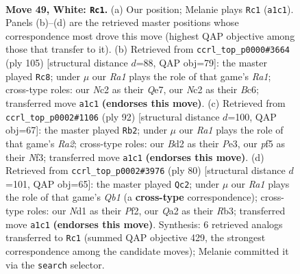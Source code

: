 \documentclass[11pt]{article}
\begin{document}
\clearpage

\begin{figure}[p]\centering
\begin{subfigure}{0.46\textwidth}\centering
\resizebox{\linewidth}{!}{%
\newchessgame
\chessboard[
  setfen={nr4k1/1q4n1/p2b1r2/P1p2p1p/3p1Pp1/1P4P1/QRNBP2P/R2N2K1 w - - 14 49},
  showmover=false,
  pgfstyle=straightmove, color=movearrow, markmove={a1-c1}
]}
\caption{}
\end{subfigure}\hfill
\begin{subfigure}{0.46\textwidth}\centering
\resizebox{\linewidth}{!}{%
\newchessgame
\chessboard[
  setfen={r5k1/3rqp2/1pbpn1p1/7p/1PP1Pp1P/1B1R1N2/3Q1PP1/4R1K1 b - - 36 53},
  showmover=false,
  pgfstyle=straightmove, color=movearrow, markmove={a8-c8}
]}
\caption{}
\end{subfigure}
\\[4pt]
\begin{subfigure}{0.46\textwidth}\centering
\resizebox{\linewidth}{!}{%
\newchessgame
\chessboard[
  setfen={1q6/rprn1pk1/2pb2p1/P2p3p/3P4/3BPNPP/R4PK1/RQ6 w - - 37 47},
  showmover=false,
  pgfstyle=straightmove, color=movearrow, markmove={a2-b2}
]}
\caption{}
\end{subfigure}\hfill
\begin{subfigure}{0.46\textwidth}\centering
\resizebox{\linewidth}{!}{%
\newchessgame
\chessboard[
  setfen={6k1/r4pp1/rnqb3p/2p1p3/2PpP3/PR1P1N1P/5PP1/RQB3K1 w - - 6 41},
  showmover=false,
  pgfstyle=straightmove, color=movearrow, markmove={b1-c2}
]}
\caption{}
\end{subfigure}
\caption{\textbf{Move 49, White: \texttt{Rc1}.} (a) Our position; Melanie plays \texttt{Rc1} (\texttt{a1c1}). Panels (b)--(d) are the retrieved master positions whose correspondence most drove this move (highest QAP objective among those that transfer to it). (b) Retrieved from \texttt{ccrl\_top\_p0000\#3664} (ply 105) [structural distance $d$=88, QAP obj=79]: the master played \texttt{Rc8}; under $\mu$ our \emph{Ra1} plays the role of that game's \emph{Ra1}; cross-type roles: our \emph{N}c2 as their \emph{Q}e7, our \emph{N}c2 as their \emph{B}c6; transferred move \texttt{a1c1} \textbf{(endorses this move)}. (c) Retrieved from \texttt{ccrl\_top\_p0002\#1106} (ply 92) [structural distance $d$=100, QAP obj=67]: the master played \texttt{Rb2}; under $\mu$ our \emph{Ra1} plays the role of that game's \emph{Ra2}; cross-type roles: our \emph{B}d2 as their \emph{P}e3, our \emph{p}f5 as their \emph{N}f3; transferred move \texttt{a1c1} \textbf{(endorses this move)}. (d) Retrieved from \texttt{ccrl\_top\_p0002\#3976} (ply 80) [structural distance $d$=101, QAP obj=65]: the master played \texttt{Qc2}; under $\mu$ our \emph{Ra1} plays the role of that game's \emph{Qb1} (a \textbf{cross-type} correspondence); cross-type roles: our \emph{N}d1 as their \emph{P}f2, our \emph{Q}a2 as their \emph{R}b3; transferred move \texttt{a1c1} \textbf{(endorses this move)}. Synthesis: 6 retrieved analogs transferred to \texttt{Rc1} (summed QAP objective 429, the strongest correspondence among the candidate moves); Melanie committed it via the \texttt{search} selector.}
\label{fig:thought-m96}
\end{figure}
\end{document}

